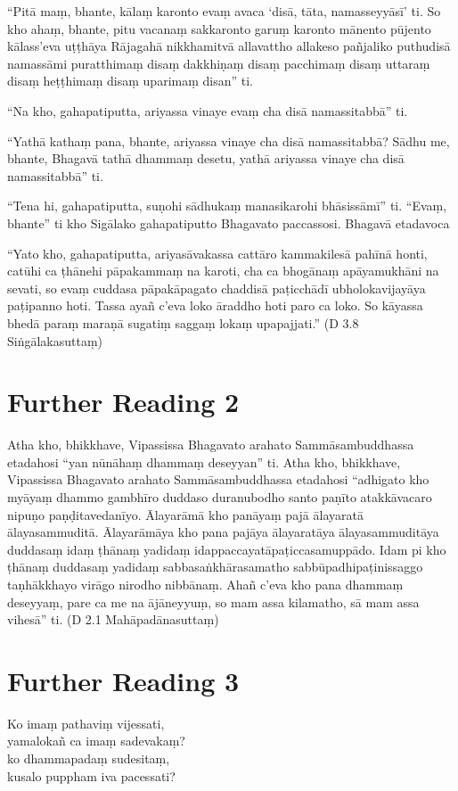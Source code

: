 “Pitā maṃ, bhante, kālaṃ karonto evaṃ avaca ‘disā, tāta, namasseyyāsī’ ti. So kho ahaṃ, bhante, pitu vacanaṃ sakkaronto garuṃ karonto mānento pūjento kālass’eva uṭṭhāya Rājagahā nikkhamitvā allavattho allakeso pañjaliko puthudisā namassāmi puratthimaṃ disaṃ dakkhiṇaṃ disaṃ pacchimaṃ disaṃ uttaraṃ disaṃ heṭṭhimaṃ disaṃ uparimaṃ disan” ti.

“Na kho, gahapatiputta, ariyassa vinaye evaṃ cha disā namassitabbā” ti.

“Yathā kathaṃ pana, bhante, ariyassa vinaye cha disā namassitabbā? Sādhu me, bhante, Bhagavā tathā dhammaṃ desetu, yathā ariyassa vinaye cha disā namassitabbā” ti.

“Tena hi, gahapatiputta, suṇohi sādhukaṃ manasikarohi bhāsissāmī” ti. “Evaṃ, bhante” ti kho Sigālako gahapatiputto Bhagavato paccassosi. Bhagavā etadavoca

“Yato kho, gahapatiputta, ariyasāvakassa cattāro kammakilesā pahīnā honti, catūhi ca ṭhānehi pāpakammaṃ na karoti, cha ca bhogānaṃ apāyamukhāni na sevati, so evaṃ cuddasa pāpakāpagato chaddisā paṭicchādī ubholokavijayāya paṭipanno hoti. Tassa ayañ c’eva loko āraddho hoti paro ca loko. So kāyassa bhedā paraṃ maraṇā sugatiṃ saggaṃ lokaṃ upapajjati.” (D 3.8 Siṅgālakasuttaṃ)

\section*{Further Reading 2}

Atha kho, bhikkhave, Vipassissa Bhagavato arahato Sammāsambuddhassa etadahosi “yan nūnāhaṃ dhammaṃ deseyyan” ti. Atha kho, bhikkhave, Vipassissa Bhagavato arahato Sammāsambuddhassa etadahosi “adhigato kho myāyaṃ dhammo gambhīro duddaso duranubodho santo paṇīto atakkāvacaro nipuṇo paṇḍitavedanīyo. Ālayarāmā kho panāyaṃ pajā ālayaratā ālayasammuditā. Ālayarāmāya kho pana pajāya ālayaratāya ālayasammuditāya duddasaṃ idaṃ ṭhānaṃ yadidaṃ idappaccayatāpaṭiccasamuppādo. Idam pi kho ṭhānaṃ duddasaṃ yadidaṃ sabbasaṅkhārasamatho sabbūpadhipaṭinissaggo taṇhākkhayo virāgo nirodho nibbānaṃ. Ahañ c’eva kho pana dhammaṃ deseyyaṃ, pare ca me na ājāneyyuṃ, so mam assa kilamatho, sā mam assa vihesā” ti. (D 2.1 Mahāpadānasuttaṃ)

\section*{Further Reading 3}

Ko imaṃ pathaviṃ vijessati,\\
yamalokañ ca imaṃ sadevakaṃ?\\
ko dhammapadaṃ sudesitaṃ,\\
kusalo puppham iva pacessati?


